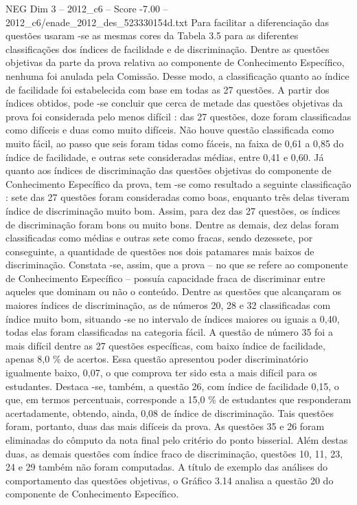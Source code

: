 \begin{textsample}{NEG Dim 3 – 2012\_c6 – Score -7.00 – 2012\_c6/enade\_2012\_des\_523330154d.txt}
Para facilitar a diferenciação das questões usaram -se as mesmas cores da Tabela 3.5 para as diferentes classificações dos índices de facilidade e de discriminação.
Dentre as questões objetivas da parte da prova relativa ao componente de Conhecimento Específico, nenhuma foi anulada pela Comissão.
Desse modo, a classificação quanto ao índice de facilidade foi estabelecida com base em todas as 27 questões.
A partir dos índices obtidos, pode -se concluir que cerca de metade das questões objetivas da prova foi considerada pelo menos difícil : das 27 questões, doze foram classificadas como difíceis e duas como muito difíceis.
Não houve questão classificada como muito fácil, ao passo que seis foram tidas como fáceis, na faixa de 0,61 a 0,85 do índice de facilidade, e outras sete consideradas médias, entre 0,41 e 0,60.
Já quanto aos índices de discriminação das questões objetivas do componente de Conhecimento Específico da prova, tem -se como resultado a seguinte classificação : sete das 27 questões foram consideradas como boas, enquanto três delas tiveram índice de discriminação muito bom.
Assim, para dez das 27 questões, os índices de discriminação foram bons ou muito bons.
Dentre as demais, dez delas foram classificadas como médias e outras sete como fracas, sendo dezessete, por conseguinte, a quantidade de questões nos dois patamares mais baixos de discriminação.
Constata -se, assim, que a prova – no que se refere ao componente de Conhecimento Específico – possuía capacidade fraca de discriminar entre aqueles que dominam ou não o conteúdo.
Dentre as questões que alcançaram os maiores índices de discriminação, as de números 20, 28 e 32 classificadas com índice muito bom, situando -se no intervalo de índices maiores ou iguais a 0,40, todas elas foram classificadas na categoria fácil.
A questão de número 35 foi a mais difícil dentre as 27 questões específicas, com baixo índice de facilidade, apenas 8,0 \% de acertos.
Essa questão apresentou poder discriminatório igualmente baixo, 0,07, o que comprova ter sido esta a mais difícil para os estudantes.
Destaca -se, também, a questão 26, com índice de facilidade 0,15, o que, em termos percentuais, corresponde a 15,0 \% de estudantes que responderam acertadamente, obtendo, ainda, 0,08 de índice de discriminação.
Tais questões foram, portanto, duas das mais difíceis da prova.
As questões 35 e 26 foram eliminadas do cômputo da nota final pelo critério do ponto bisserial.
Além destas duas, as demais questões com índice fraco de discriminação, questões 10, 11, 23, 24 e 29 também não foram computadas.
A título de exemplo das análises do comportamento das questões objetivas, o Gráfico 3.14 analisa a questão 20 do componente de Conhecimento Específico.

\end{textsample}
